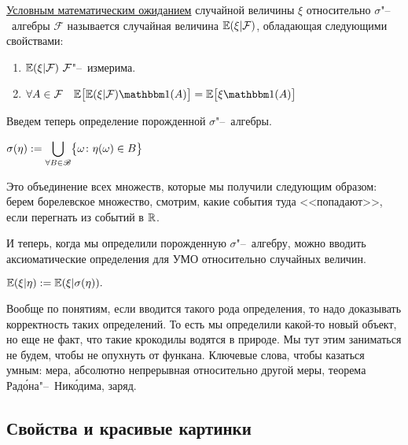 \documentclass[../TV&MS.tex]{subfiles}
\begin{document}
\begin{Def}
    \uline{Условным математическим ожиданием} случайной величины $\xi$ 
    относительно $\sigma$"--~алгебры $\mathcal{F}$ называется случайная
    величина $\mathbb{E}(\xi | \mathcal{F})$, обладающая следующими свойствами:
    \begin{enumerate}
        \item $\Expec(\xi | \mathcal{F})\ \mathcal{F}$"--~измерима.
        \item $\forall A \in \mathcal{F} \quad 
            \Expec\bigl[ \Expec(\xi | \mathcal{F}) \Ind(A) \bigr] =
            \Expec \bigl[ \xi \Ind(A) \bigr]$
    \end{enumerate} 
\end{Def}

Введем теперь определение порожденной $\sigma$"--~алгебры.

\begin{Def}
    $\displaystyle \sigma(\eta) := 
    \bigcup\limits_{\forall B \in \mathscr{B}} \bigl\{\omega \colon \eta(\omega) \in B\bigr\}$
\end{Def} 

\begin{Wtf}
    Это объединение всех множеств, которые мы получили следующим образом:
    берем борелевское множество, смотрим, какие события туда <<попадают>>,
    если перегнать из событий в $\mathbb{R}$.
\end{Wtf} 

И теперь, когда мы определили порожденную $\sigma$"--~алгебру,
можно вводить аксиоматические определения для УМО относительно случайных величин.

\begin{Def}
    $\mathbb{E}(\xi | \eta) := \mathbb{E}(\xi | \sigma(\eta)).$
\end{Def} 

Вообще по понятиям, если вводится такого рода определения, то надо доказывать корректность таких определений.
То есть мы определили какой-то новый объект, но еще не факт, что такие крокодилы водятся в природе.
Мы тут этим заниматься не будем, чтобы не опухнуть от функана.
Ключевые слова, чтобы казаться умным: мера, абсолютно непрерывная относительно другой меры, теорема Рад\'{о}на"--~Ник\'{о}дима, заряд.

\subsection{Свойства и красивые картинки}
\end{document}
